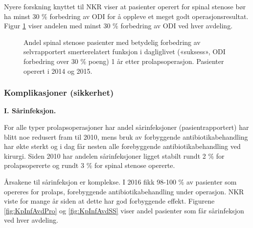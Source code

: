 \documentclass [norsk,a4paper,twoside]{article}\usepackage[]{graphicx}\usepackage[]{color}
\begin{document}
Nyere forskning knyttet til NKR viser at pasienter operert for spinal stenose bør ha minst 30 \% forbedring av ODI for å oppleve et meget godt operasjonsresultat. Figur \ref{fig:OswEndr30pstSS} viser andelen med minst 30 \% forbedring av ODI ved hver avdeling.

\begin{figure}[ht]
\caption{\label{fig:OswEndr30pstSS} Andel spinal stenose pasienter med betydelig forbedring av selvrapportert
smerterelatert funksjon i dagliglivet («suksess», ODI forbedring over 30 \% poeng) 1 år
etter prolapsoperasjon. Pasienter operert i 2014 og 2015.}
\end{figure}













\subsubsection{Komplikasjoner (sikkerhet)}

\textbf{I. Sårinfeksjon.}

For alle typer prolapsoperasjoner har
andel sårinfeksjoner (pasientrapportert) har blitt noe redusert fram til 2010, mens bruk av  forbyggende antibiotikabehandling har økte sterkt og i dag får nesten alle forebyggende antibiotikabehandling ved kirurgi. Siden 2010 har andelen sårinfeksjoner ligget stabilt rundt 2 \% for prolapsopererte og rundt 3 \% for spinal stenose opererte.



Årsakene til sårinfeksjon er komplekse. I 2016 fikk 98-100 \% av pasienter som
opereres for prolaps, forebyggende antibiotikabehandling under operasjon. NKR
viste for mange år siden at dette har god forbyggende effekt. Figurene \ref{fig:KpInfAvdPro} og \ref{fig:KpInfAvdSS} viser andel pasienter som får sårinfeksjon ved hver avdeling.
\end{document}
